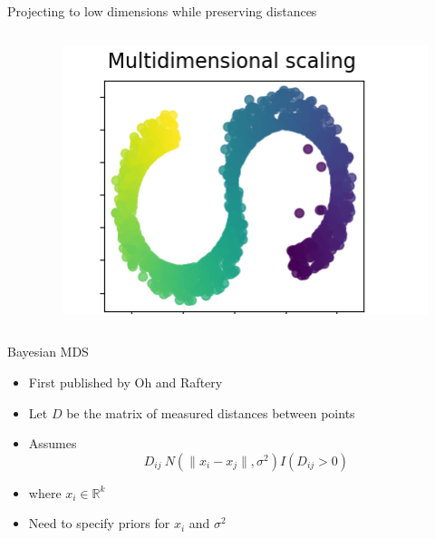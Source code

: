 \documentclass{beamer}
\begin{document}
\begin{frame}{Projecting to low dimensions while preserving distances}
\begin{columns}
\begin{column}{0.01\textwidth}
        \end{column}
        \begin{column}{0.4\textwidth}
            \begin{figure}
            \includegraphics[width=\textwidth]{standalone/mds_2.png}
        \end{figure}   
        \end{column}
    \end{columns}
    \centering
    \tiny{\cite{scikit-learn}}
\end{frame}     


\begin{frame}{Bayesian MDS}
    \begin{itemize}
        \item First published by Oh and Raftery \cite{oh2001bayesian}
        \item Let $D$ be the matrix of measured distances between points
        \item Assumes \[ D_{ij} ~ N(\lVert x_i - x_j \rVert,\sigma^2)I(D_{ij} > 0) \]
        \item where $x_i \in \mathbb{R}^k$
        \item Need to specify priors for $x_i$ and $\sigma^2$
    \end{itemize}
\end{frame}
\end{document}
